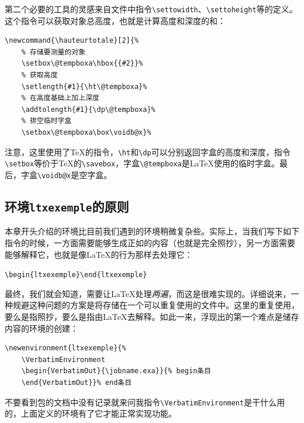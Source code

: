 第二个必要的工具的灵感来自文件中指令\verb|\settowidth|、\verb|\settoheight|等的定义。这个指令可以获取对象总高度，也就是计算高度和深度的和：

\begin{dmd}
\begin{verbatim}
\newcommand{\hauteurtotale}[2]{% 
    % 存储要测量的对象
    \setbox\@tempboxa\hbox{{#2}}%
    % 获取高度
    \setlength{#1}{\ht\@tempboxa}% 
    % 在高度基础上加上深度
    \addtolength{#1}{\dp\@tempboxa}%
    % 排空临时字盒
    \setbox\@tempboxa\box\voidb@x}%
\end{verbatim}
\end{dmd}

注意，这里使用了\TeX 的指令，\verb|\ht|和\verb|\dp|可以分别返回字盒的高度和深度，指令\verb|\setbox|等价于\TeX 的\verb|\savebox|，字盒\verb|\@tempboxa|是\LaTeX 使用的临时字盒。最后，字盒\verb|\voidb@x|是空字盒。

\subsection{环境\texttt{ltxexemple}的原则}

本章开头介绍的环境比目前我们遇到的环境稍微复杂些。实际上，当我们写下如下指令的时候，一方面需要能够生成正如的内容（也就是完全照抄），另一方面需要能够解释它，也就是像\LaTeX 的行为那样去处理它：

\begin{dmd}
\verb|\begin{ltxexemple}|\verb|\end{ltxexemple}|
\end{dmd}

最终，我们就会知道，需要让\LaTeX 处理\emph{两遍}，而这是很难实现的。详细说来，一种规避这种问题的方案是将存储在一个可以重复使用的文件中。这里的重复使用，要么是指照抄，要么是指由\LaTeX 去解释。如此一来，浮现出的第一个难点是储存内容的环境的创建：

\begin{dmd}
\begin{verbatim}
\newenvironment{ltxexemple}{% 
    \VerbatimEnvironment 
    \begin{VerbatimOut}{\jobname.exa}}{% begin条目
    \end{VerbatimOut}}% end条目
\end{verbatim}
\end{dmd}

\begin{qquestion}
不要看到包的文档中没有记录就来问我指令\verb|\VerbatimEnvironment|是干什么用的，上面定义的环境有了它才能正常实现功能。
\end{qquestion}

